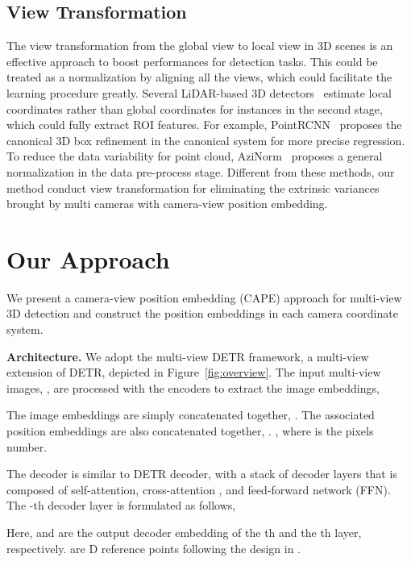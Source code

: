 \documentclass[10pt,twocolumn,letterpaper]{article}
\begin{document}
\subsection{View Transformation}
The view transformation from the global view to local view in 3D scenes is an effective approach to boost performances for detection tasks. This could be treated as a normalization by aligning all the views, which could facilitate the learning procedure greatly.
Several LiDAR-based 3D detectors~\cite{shi2019pointrcnn, qi2018frustum, shi2020points, meyer2019lasernet, fan2021rangedet} estimate local coordinates rather than global coordinates for instances in the second stage, which could fully extract ROI features. 
For example, PointRCNN~\cite{shi2019pointrcnn} proposes the canonical 3D box refinement in the canonical system for more precise regression. 
To reduce the data variability for point cloud, AziNorm~\cite{chen2022azinorm} proposes a general normalization in the data pre-process stage.
Different from these methods, our method conduct view transformation for eliminating the extrinsic variances brought by multi cameras with camera-view position embedding.
%
 








\section{Our Approach}
We present a camera-view position embedding (CAPE) approach for multi-view 3D detection 
and construct the position embeddings
in each camera coordinate system.

\vspace{2mm}
\noindent\textbf{Architecture.}
We adopt the multi-view DETR framework,
a multi-view extension of DETR,
depicted in Figure~\ref{fig:overview}.
The input multi-view images,
, 
are processed with the encoders to extract the image embeddings,

The  image embeddings
are simply concatenated together,
.
The associated position embeddings
are also concatenated together,
. , where  is the pixels number.

The decoder is similar to DETR decoder, with a stack of  decoder layers
that is composed of
self-attention, cross-attention , and feed-forward network (FFN).
The -th decoder layer is formulated as 
follows,

Here,
 and 
are the output decoder embedding of the th and the th layer, respectively.
 are D reference points following the design in \cite{zhu2020deformable,liu2022petr}.
\end{document}
